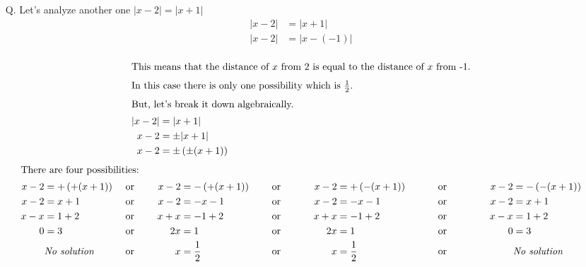 \begin{enumerate}
    \item[Q.] Let's analyze another one $|x-2|=|x+1|$
        \begin{align*}
            |x-2| &= |x+1|\\
            |x-2| &= |x- (-1)|\\
        \end{align*}
        \begin{center}
        \end{center}
        \begin{align*}
            \intertext{This means that the distance of $x$ from 2 is equal to the distance of $x$ from -1.}
            \intertext{In this case there is only one possibility which is $\frac{1}{2}$.}
            \intertext{But, let's break it down algebraically.}
            |x-2| &= |x+1|\\
            x-2 &= \pm |x+1|\\
            x-2 &= \pm \left(\pm(x+1)\right)\\
        \end{align*}
        \begin{align*}
            \intertext{There are four possibilities:}
            x-2 &= + \left(+(x+1)\right) && \text{ or } &&& x-2 &= - \left(+(x+1)\right) &&&& \text{ or }  &&&&& x-2 &= + \left(-(x+1)\right) &&&&&& \text{ or } &&&&&&& x-2 &= - \left(-(x+1)\right)\\
            x-2 &= x+1 && \text{ or } &&& x-2 &= -x-1  &&&& \text{ or } &&&&& x-2 &= -x-1  &&&&&& \text{ or } &&&&&&& x-2 &= x+1\\
            x-x &= 1+2 && \text{ or } &&& x+x &= -1+2  &&&& \text{ or } &&&&& x+x &= -1+2  &&&&&& \text{ or } &&&&&&& x-x &= 1+2\\
            0 &= 3 && \text{ or } &&& 2x &= 1  &&&& \text{ or } &&&&& 2x &= 1  &&&&&& \text{ or } &&&&&&& 0 &= 3\\
            &\textit{No solution} && \text{ or } &&& x &= \frac{1}{2}  &&&& \text{ or } &&&&& x &= \frac{1}{2}  &&&&&& \text{ or } &&&&&&& &\textit{No solution}

\end{align*}
\end{enumerate}
